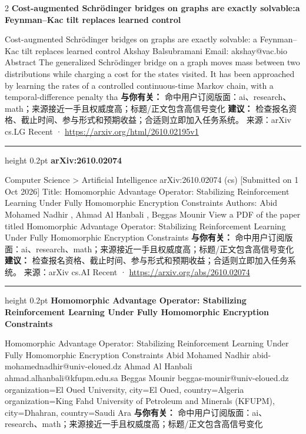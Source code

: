 \documentclass[10.5pt]{ctexart}
\begin{document}
\begin{multicols}{2}
{\large\bfseries Cost-augmented Schrödinger bridges on graphs are exactly solvable:a Feynman–Kac tilt replaces learned control}\par
Cost-augmented Schrödinger bridges on graphs are exactly solvable: a Feynman–Kac tilt replaces learned control Akshay Balsubramani Email: akshay@vac.bio Abstract The generalized Schrödinger bridge on a graph moves mass between two distributions while charging a cost for the states visited. It has been approached by learning the rates of a controlled continuous-time Markov chain, with a temporal-difference penalty tha
\textbf{与你有关：} 命中用户订阅版面：ai、research、math；来源接近一手且权威度高；标题/正文包含高信号变化
\textbf{建议：} 检查报名资格、截止时间、参与形式和预期收益；合适则立即加入任务系统。
{\footnotesize\color{ormuted} 来源：arXiv cs.LG Recent · \url{https://arxiv.org/html/2610.02195v1}}
\vspace{2mm}
\hrule height 0.2pt
\vspace{2mm}
{\large\bfseries arXiv:2610.02074}\par
Computer Science > Artificial Intelligence arXiv:2610.02074 (cs) [Submitted on 1 Oct 2026] Title: Homomorphic Advantage Operator: Stabilizing Reinforcement Learning Under Fully Homomorphic Encryption Constraints Authors: Abid Mohamed Nadhir , Ahmad Al Hanbali , Beggas Mounir View a PDF of the paper titled Homomorphic Advantage Operator: Stabilizing Reinforcement Learning Under Fully Homomorphic Encryption Constraints
\textbf{与你有关：} 命中用户订阅版面：ai、research、math；来源接近一手且权威度高；标题/正文包含高信号变化
\textbf{建议：} 检查报名资格、截止时间、参与形式和预期收益；合适则立即加入任务系统。
{\footnotesize\color{ormuted} 来源：arXiv cs.AI Recent · \url{https://arxiv.org/abs/2610.02074}}
\vspace{2mm}
\hrule height 0.2pt
\vspace{2mm}
{\large\bfseries Homomorphic Advantage Operator: Stabilizing Reinforcement Learning Under Fully Homomorphic Encryption Constraints}\par
Homomorphic Advantage Operator: Stabilizing Reinforcement Learning Under Fully Homomorphic Encryption Constraints Abid Mohamed Nadhir abid-mohamednadhir@univ-eloued.dz Ahmad Al Hanbali ahmad.alhanbali@kfupm.edu.sa Beggas Mounir beggas-mounir@univ-eloued.dz organization=El Oued University, city=El Oued, country=Algeria organization=King Fahd University of Petroleum and Minerals (KFUPM), city=Dhahran, country=Saudi Ara
\textbf{与你有关：} 命中用户订阅版面：ai、research、math；来源接近一手且权威度高；标题/正文包含高信号变化

\end{multicols}
\end{document}
